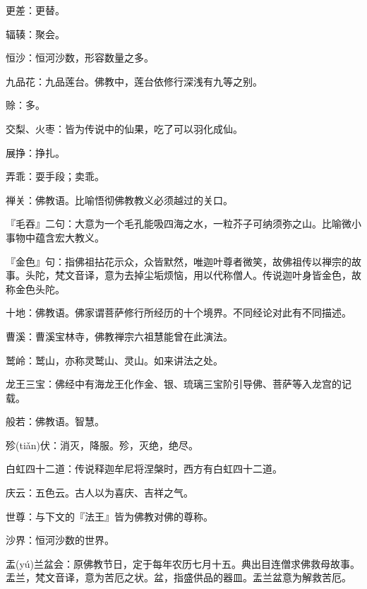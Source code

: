 \startbuffer[310]
更差：更替。
\stopbuffer


\startbuffer[311]
辐辏：聚会。
\stopbuffer


\startbuffer[312]
恒沙：恒河沙数，形容数量之多。
\stopbuffer


\startbuffer[313]
九品花：九品莲台。佛教中，莲台依修行深浅有九等之别。
\stopbuffer


\startbuffer[314]
赊：多。
\stopbuffer


\startbuffer[315]
交梨、火枣：皆为传说中的仙果，吃了可以羽化成仙。
\stopbuffer


\startbuffer[316]
展挣：挣扎。
\stopbuffer


\startbuffer[317]
弄乖：耍手段；卖乖。
\stopbuffer


\startbuffer[318]
禅关：佛教语。比喻悟彻佛教教义必须越过的关口。
\stopbuffer


\startbuffer[319]
『毛吞』二句：大意为一个毛孔能吸四海之水，一粒芥子可纳须弥之山。比喻微小事物中蕴含宏大教义。
\stopbuffer


\startbuffer[320]
『金色』句：指佛祖拈花示众，众皆默然，唯迦叶尊者微笑，故佛祖传以禅宗的故事。头陀，梵文音译，意为去掉尘垢烦恼，用以代称僧人。传说迦叶身皆金色，故称金色头陀。
\stopbuffer


\startbuffer[321]
十地：佛教语。佛家谓菩萨修行所经历的十个境界。不同经论对此有不同描述。
\stopbuffer


\startbuffer[322]
曹溪：曹溪宝林寺，佛教禅宗六祖慧能曾在此演法。
\stopbuffer


\startbuffer[323]
鹫岭：鹫山，亦称灵鹫山、灵山。如来讲法之处。
\stopbuffer


\startbuffer[324]
龙王三宝：佛经中有海龙王化作金、银、琉璃三宝阶引导佛、菩萨等入龙宫的记载。
\stopbuffer


\startbuffer[325]
般若：佛教语。智慧。
\stopbuffer


\startbuffer[326]
殄(tiǎn)伏：消灭，降服。殄，灭绝，绝尽。
\stopbuffer


\startbuffer[327]
白虹四十二道：传说释迦牟尼将涅槃时，西方有白虹四十二道。
\stopbuffer


\startbuffer[328]
庆云：五色云。古人以为喜庆、吉祥之气。
\stopbuffer


\startbuffer[329]
世尊：与下文的『法王』皆为佛教对佛的尊称。
\stopbuffer


\startbuffer[330]
沙界：恒河沙数的世界。
\stopbuffer


\startbuffer[331]
盂(yú)兰盆会：原佛教节日，定于每年农历七月十五。典出目连僧求佛救母故事。盂兰，梵文音译，意为苦厄之状。盆，指盛供品的器皿。盂兰盆意为解救苦厄。
\stopbuffer


